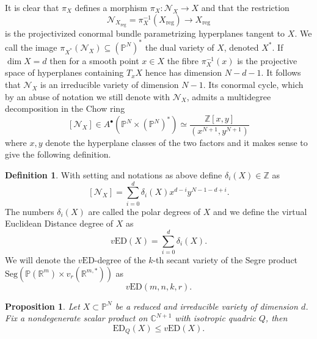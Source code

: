 \documentclass[11pt]{article}
\numberwithin{equation}{section}
\numberwithin{figure}{section}
\theoremstyle{plain}
\newtheorem{prop}[thm]{Proposition}
\theoremstyle{definition}
\newtheorem{defn}[thm]{Definition}
\theoremstyle{remark}
\newcommand{\su}{\subseteq}
\newcommand{\R}{\mathbb{R}}
\newcommand{\C}{\mathbb{C}}
\renewcommand{\P}{\mathbb{P}}
\newcommand{\ED}{\mathrm{ED}}
\newcommand{\vED}{v\mathrm{ED}}
\newcommand{\Seg}{\mathrm{Seg}}
\begin{document}
It is clear that $\pi_X$ defines a morphism $\pi_X : \mathcal{N}_X \to X$ and that the restriction 
\[
\mathcal{N}_ {X_\mathrm{reg}} = \pi _X ^{-1} \left( X_\mathrm{reg}\right) \to X_\mathrm{reg}
\]
is the projectivized conormal bundle parametrizing hyperplanes tangent to $X$. We call the image  $\pi_{ X^\ast }\left( \mathcal{N}_X\right)\su \left( \P^N\right)^\ast$ the dual variety of $X$, denoted $X^\ast$. If $\dim X =d$ then for a smooth point $x\in X$ the fibre $\pi^{-1} _X (x)$ is the projective space of hyperplanes containing $T_x X$ hence has dimension $N-d-1$. It follows that $\mathcal N_X$ is an irreducible variety of dimension $N-1$. Its conormal cycle, which by an abuse of notation we still denote with $\mathcal{N} _X$, admits a multidegree decomposition in the Chow ring
\[
\left[ \mathcal{N} _X \right]\in A
^\bullet\left( \P^N \times\left(\P^N \right) ^\ast\right)\simeq\frac{\mathbb Z \left[x,y\right]}{\left( x^{N+1},y^{N+1}\right)}
\]
where $x,y$ denote the hyperplane classes of the two factors and it makes sense to give the following definition.
\begin{defn}
    With setting and notations as above define $\delta_i \left( X\right)\in\mathbb Z$ as
    \[
    \left[ \mathcal N _X \right] = \sum _{i=0} ^{d} \delta_i \left( X\right)x^{d-i} y^{N-1 -d+i}.
    \]
    The numbers $\delta_i \left( X\right)$ are called the polar degrees of $X$ and we define the virtual Euclidean Distance degree of $X$ as
    \[
    \vED \left(X\right)=\sum _{i=0} ^{d} \delta_i \left( X\right).
    \]
    We will denote the $\vED$-degree of the $k$-th secant variety of the Segre product $\Seg\left(\P\left( \R^m\right) \times v_r \left(\R^{m,\ast}\right) \right)$ as
\[
\vED\left( m,n,k,r\right).
\]
\end{defn}

\begin{prop}\label{prop:VirtualEDInequality}
Let $X \subset \mathbb{P}^{N}$ be a reduced and irreducible variety of dimension $d$.
Fix a nondegenerate scalar product on $\C^{N+1}$ with isotropic quadric $Q$, then $$\ED_Q(X)\le \vED(X).$$
\end{prop}
\end{document}
